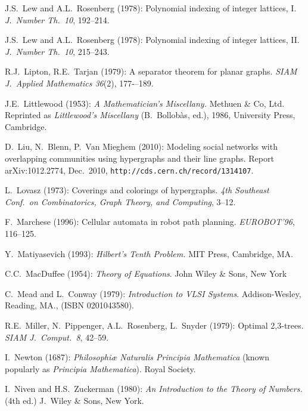 \begin{thebibliography}{999}
J.S.~Lew and A.L.~Rosenberg (1978): Polynomial indexing of integer
lattices, I.  {\it J.~Number Th.~10}, 192--214.
 
J.S.~Lew and A.L.~Rosenberg (1978): Polynomial indexing of integer
lattices, II.  {\it J.~Number Th.~10}, 215--243.

R.J.~Lipton, R.E.~Tarjan (1979):
A separator theorem for planar graphs.
{\it SIAM J.~Applied Mathematics 36}(2), 177-–189.

J.E.~Littlewood (1953):
{\it A Mathematician's Miscellany.}
Methuen \& Co, Ltd.
Reprinted as {\it Littlewood's Miscellany} (B.~Bollob\`{a}s, ed.),
1986, University Press, Cambridge.

D.~Liu, N.~Blenn, P.~Van Mieghem (2010):
Modeling social networks with overlapping communities using
hypergraphs and their line graphs.
Report arXiv:1012.2774, Dec.~2010,
{\tt http://cds.cern.ch/record/1314107}.

L.~Lovasz (1973): Coverings and colorings of hypergraphs.  {\it 4th
  Southeast Conf.~on Combinatorics, Graph Theory, and Computing},
3--12.


F.~Marchese (1996): Cellular automata in robot path planning.
{\it EUROBOT'96}, 116--125.

Y.~Matiyasevich (1993):
{\it Hilbert's Tenth Problem.}
MIT Press, Cambridge, MA.

C.C.~MacDuffee (1954):
{\it Theory of Equations}.
John Wiley \& Sons, New York

C.~Mead and L.~Conway (1979):
{\it Introduction to VLSI Systems}.
Addison-Wesley, Reading, MA., (ISBN 0201043580).


R.E.~Miller, N.~Pippenger, A.L.~Rosenberg, L.~Snyder (1979): Optimal
2,3-trees.  {\it SIAM J.~Comput.~8}, 42--59.



I.~Newton (1687): {\it Philosophiæ Naturalis Principia Mathematica}
(known popularly as {\it Principia Mathematica}).
Royal Society.


I.~Niven and H.S.~Zuckerman (1980):
{\it An Introduction to the Theory of Numbers.} (4th ed.)
J.~Wiley \& Sons, New York.


\end{thebibliography}
